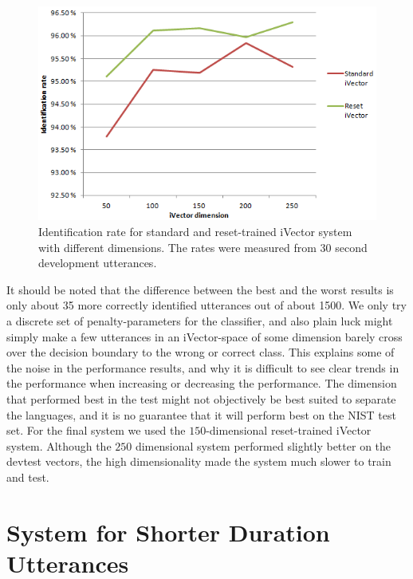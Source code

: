\begin{figure}[hbt!]
	\begin{center}
	\includegraphics{figures/dimidentification.png}
	\caption{Identification rate for standard and reset-trained iVector system with different dimensions. The rates were measured from 30 second development utterances.}
	\label{fig:dimidrate}
	\end{center}
\end{figure}

It should be noted that the difference between the best and the worst results is only about 35 more correctly identified utterances out of about 1500. We only try a discrete set of penalty-parameters for the classifier, and also plain luck might simply make a few utterances in an iVector-space of some dimension barely cross over the decision boundary to the wrong or correct class. This explains some of the noise in the performance results, and why it is difficult to see clear trends in the performance when increasing or decreasing the performance. The dimension that performed best in the test might not objectively be best suited to separate the languages, and it is no guarantee that it will perform best on the NIST test set. For the final system we used the $150$-dimensional reset-trained iVector system. Although the $250$ dimensional system performed slightly better on the devtest vectors, the high dimensionality made the system much slower to train and test. 

\section{System for Shorter Duration Utterances}
\label{sect:ivectshort}


